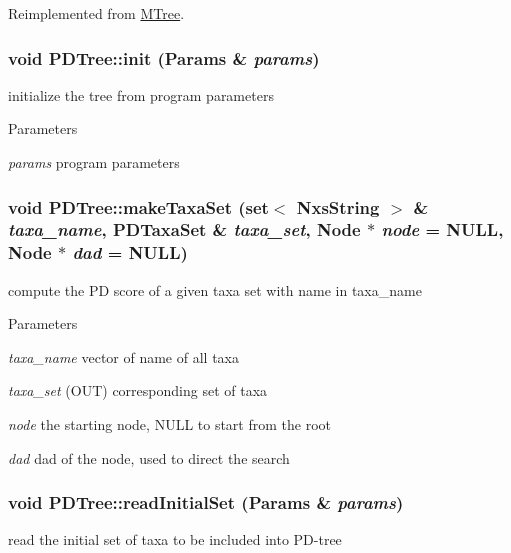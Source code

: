 Reimplemented from \hyperlink{classMTree_ad7da0ad44a31e8e98262bd7ad0f494ab}{MTree}.\hypertarget{classPDTree_ac90fad3aa9dd0dd64594a15135c8685a}{
\subsubsection[{init}]{\setlength{\rightskip}{0pt plus 5cm}void PDTree::init ({\bf Params} \& {\em params})}}
\label{classPDTree_ac90fad3aa9dd0dd64594a15135c8685a}
initialize the tree from program parameters 
\begin{DoxyParams}{Parameters}
\item[{\em params}]program parameters \end{DoxyParams}
\hypertarget{classPDTree_aff9a948210c8eaeab55b820fb908c3c1}{
\subsubsection[{makeTaxaSet}]{\setlength{\rightskip}{0pt plus 5cm}void PDTree::makeTaxaSet (set$<$ {\bf NxsString} $>$ \& {\em taxa\_\-name}, \/  {\bf PDTaxaSet} \& {\em taxa\_\-set}, \/  {\bf Node} $\ast$ {\em node} = {\ttfamily NULL}, \/  {\bf Node} $\ast$ {\em dad} = {\ttfamily NULL})}}
\label{classPDTree_aff9a948210c8eaeab55b820fb908c3c1}
compute the PD score of a given taxa set with name in taxa\_\-name 
\begin{DoxyParams}{Parameters}
\item[{\em taxa\_\-name}]vector of name of all taxa \item[{\em taxa\_\-set}](OUT) corresponding set of taxa \item[{\em node}]the starting node, NULL to start from the root \item[{\em dad}]dad of the node, used to direct the search \end{DoxyParams}
\hypertarget{classPDTree_a74fae123a26ba1061e5bba39f2b88525}{
\subsubsection[{readInitialSet}]{\setlength{\rightskip}{0pt plus 5cm}void PDTree::readInitialSet ({\bf Params} \& {\em params})}}
\label{classPDTree_a74fae123a26ba1061e5bba39f2b88525}
read the initial set of taxa to be included into PD-\/tree 
